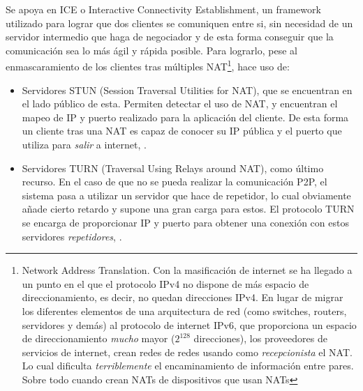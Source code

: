 Se apoya en ICE o Interactive Connectivity Establishment, \citep{wiki:ICE} un framework utilizado para lograr que dos clientes se comuniquen entre si, sin necesidad de un servidor intermedio que haga de negociador y de esta forma conseguir que la comunicación sea lo más ágil y rápida posible. Para lograrlo, pese al enmascaramiento de los clientes tras múltiples NAT\footnote{Network Address Translation. Con la masificación de internet se ha llegado a un punto en el que el protocolo IPv4 no dispone de más espacio de direccionamiento, es decir, no quedan direcciones IPv4. En lugar de migrar los diferentes elementos de una arquitectura de red (como switches, routers, servidores y demás) al protocolo de internet IPv6, que proporciona un espacio de direccionamiento \emph{mucho} mayor ($2^{128}$ direcciones), los proveedores de servicios de internet, crean redes de redes usando como \textit{recepcionista} el NAT. Lo cual dificulta \emph{terriblemente} el encaminamiento de información entre pares. Sobre todo cuando crean NATs de dispositivos que usan NATs}, hace uso de:
\begin{itemize}
 \item Servidores STUN (Session Traversal Utilities for NAT), que se encuentran en el lado público de esta. Permiten detectar el uso de NAT, y encuentran el mapeo de IP y puerto realizado para la aplicación del cliente. De esta forma un cliente tras una NAT es capaz de conocer su IP pública y el puerto que utiliza para \textit{salir} a internet, \citep{wiki:STUN}.
 \item Servidores TURN (Traversal Using Relays around NAT), como último recurso. En el caso de que no se pueda realizar la comunicación P2P, el sistema pasa a utilizar un servidor que hace de repetidor, lo cual obviamente añade cierto retardo y supone una gran carga para estos. El protocolo TURN se encarga de proporcionar IP y puerto para obtener una conexión con estos servidores \textit{repetidores}, \citep{wiki:TURN}.
\end{itemize}


